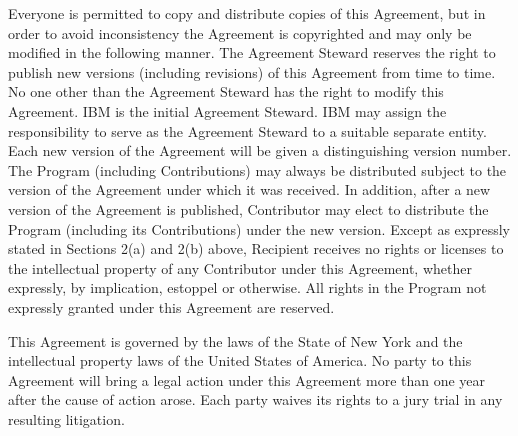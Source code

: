 Everyone is permitted to copy and distribute copies of this Agreement, but in 
order to avoid inconsistency the Agreement is copyrighted and may only be 
modified in the following manner. The Agreement Steward reserves the right to 
publish new versions (including revisions) of this Agreement from time to time. 
No one other than the Agreement Steward has the right to modify this Agreement. 
IBM is the initial Agreement Steward. IBM may assign the responsibility to 
serve as the Agreement Steward to a suitable separate entity. Each new version 
of the Agreement will be given a distinguishing version number. The Program 
(including Contributions) may always be distributed subject to the version of 
the Agreement under which it was received. In addition, after a new version of 
the Agreement is published, Contributor may elect to distribute the Program 
(including its Contributions) under the new version. Except as expressly stated 
in Sections 2(a) and 2(b) above, Recipient receives no rights or licenses to 
the intellectual property of any Contributor under this Agreement, whether 
expressly, by implication, estoppel or otherwise. All rights in the Program not 
expressly granted under this Agreement are reserved.

This Agreement is governed by the laws of the State of New York and the 
intellectual property laws of the United States of America. No party to this 
Agreement will bring a legal action under this Agreement more than one year 
after the cause of action arose. Each party waives its rights to a jury trial 
in any resulting litigation.
